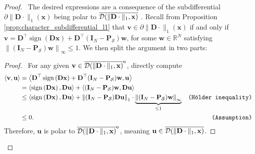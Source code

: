 \begin{proof}
    \pf\ The desired expressions are a consequence of the subdifferential $\partial \|\mathbf{D} \cdot\|_1(\mathbf{x})$ being polar to $\mathop{\overline{\mathcal{D}(\| \mathbf{D} \cdot \|_1, \mathbf{x})}}$ \cite[Thm. 23.7]{rockafellar1970}. Recall from Proposition \ref{prop:character_subdifferential_l1} that $\mathbf{v} \in \partial \|\mathbf{D} \cdot\|_1(\mathbf{x})$ if and only if $\mathbf{v} = \mathbf{D}^\top \operatorname{sign} \left ( \mathbf{Dx} \right ) + \mathbf{D}^\top (\mathbf{I}_N - \mathbf{P}_{\mathcal{S}}) \mathbf{w}$, for some $\mathbf{w} \in \mathbb{R}^{N}$ satisfying $\left\|(\mathbf{I}_N - \mathbf{P}_{\mathcal{S}}) \mathbf{w}\right\|_\infty \leq 1$. We then split the argument in two parts:

        \begin{proof}
            \pf\ For any given $\mathbf{v} \in \mathop{\overline{\mathcal{D}(\| \mathbf{D} \cdot \|_1, \mathbf{x})}}^{\mathsf{o}}$, directly compute
            \begin{align*}
                \langle \mathbf{v}, \mathbf{u} \rangle & = \left\langle \mathbf{D}^\top \operatorname{sign} \left( \mathbf{Dx} \right) + \mathbf{D}^\top (\mathbf{I}_N - \mathbf{P}_{\mathcal{S}}) \mathbf{w}, \mathbf{u} \right\rangle \\
                & = \left\langle \operatorname{sign} \left ( \mathbf{Dx} \right ), \mathbf{Du} \right\rangle + \left\langle (\mathbf{I}_N - \mathbf{P}_{\mathcal{S}}) \mathbf{w}, \mathbf{Du} \right \rangle \\
                & \leq \left\langle \operatorname{sign} \left ( \mathbf{Dx} \right ), \mathbf{Du} \right\rangle + \left\|(\mathbf{I}_N - \mathbf{P}_{\mathcal{S}}) \mathbf{Du}\right\|_1 \cdot \underbrace{\left\|(\mathbf{I}_N - \mathbf{P}_{\mathcal{S}}) \mathbf{w}\right\|_\infty}_{\leq 1} & \texttt{(H\"older inequality)} \\
                & \leq 0. & \texttt{(Assumption)}
            \end{align*}
            Therefore, $\mathbf{u}$ is polar to $\mathop{\overline{\mathcal{D}(\| \mathbf{D} \cdot \|_1, \mathbf{x})}}^{\mathsf{o}}$, meaning $\mathbf{u} \in \mathop{\overline{\mathcal{D}(\| \mathbf{D} \cdot \|_1, \mathbf{x})}}$.\hfill\qedsymbol
        \end{proof}


\end{proof}
